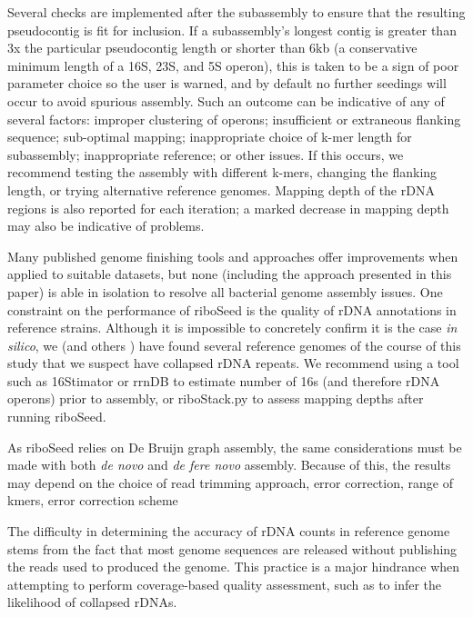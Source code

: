 \documentclass[11pt]{article}
\begin{document}
\begin{linenumbers}
Several checks are implemented after the subassembly to ensure that the resulting pseudocontig is fit for inclusion. If a subassembly’s longest contig is greater than 3x the particular pseudocontig length or shorter than 6kb (a conservative minimum length of a 16S, 23S, and 5S operon), this is taken to be a sign of poor parameter choice so the user is warned, and by default no further seedings will occur to avoid spurious assembly. Such an outcome can be indicative of any of several factors: improper clustering of operons; insufficient or extraneous flanking sequence; sub-optimal mapping; inappropriate choice of k-mer length for subassembly; inappropriate reference; or other issues. If this occurs, we recommend testing the assembly with different k-mers, changing the flanking length, or trying alternative reference genomes. Mapping depth of the rDNA regions is also reported for each iteration; a marked decrease in mapping depth may also be indicative of problems.


Many published genome finishing tools and approaches offer improvements when applied to suitable datasets, but none (including the approach presented in this paper) is able in isolation to resolve all bacterial genome assembly issues. One constraint on the performance of riboSeed is the quality of rDNA annotations in reference strains. Although it is impossible to concretely confirm it is the case \textit{in silico}, we (and others \cite{Mariano2016}) have found several reference genomes of the course of this study that we suspect have collapsed rDNA repeats. We recommend using a tool such as 16Stimator\cite{Perisin2016} or rrnDB\cite{Stoddard2014} to estimate number of 16s (and therefore rDNA operons) prior to assembly, or riboStack.py to assess mapping depths after running riboSeed.

As riboSeed relies on De Bruijn graph assembly, the same considerations must be made with both \textit{de novo} and \textit{de fere novo} assembly.  Because of this, the results may depend on the choice of read trimming approach, error correction, range of kmers, error correction scheme

The difficulty in determining the accuracy of rDNA counts in reference genome stems from the fact that most genome sequences are released without publishing the reads used to produced the genome. This practice is a major hindrance when attempting to perform coverage-based quality assessment, such as to infer the likelihood of collapsed rDNAs.





\end{linenumbers}
\end{document}
